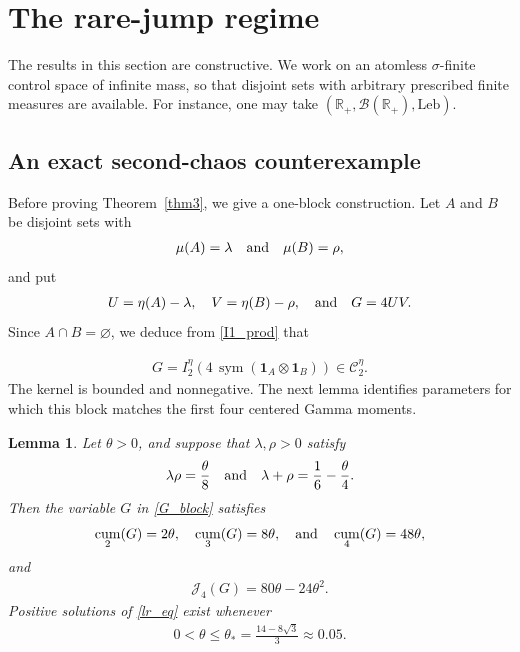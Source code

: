 \documentclass[letterpaper,11pt,reqno]{amsart}
\numberwithin{equation}{section}
\theoremstyle{plain}
\newtheorem{lemma}[theorem]{Lemma}
\theoremstyle{definition}
\theoremstyle{remark}
\newcommand{\R}{\mathbb{R}}
\newcommand{\ind}{\mathbf{1}}
\newcommand{\cC}{\mathcal{C}}
\DeclareMathOperator{\cum}{cum}
\DeclareMathOperator{\sym}{sym}
\newcommand{\noi}{\noindent}
\newcommand{\ot}{\otimes}
\newcommand{\Jfour}{\mathcal J_4}
\newcommand{\s}{\sigma}
\newcommand{\AND}{\quad{\rm and}\quad}
\begin{document}
\section{The rare-jump regime}
\label{SEC4}

 

The results in this section are constructive.  We work on an atomless
$\s$-finite control space of infinite mass, so that disjoint sets with
arbitrary prescribed finite measures are available.  For instance,
one may take $(\R_+,\mathcal B(\R_+),\mathrm{Leb})$.

 

\subsection{An exact second-chaos counterexample}
\label{SEC_34}

Before proving Theorem~\ref{thm3}, we give a one-block
construction.  Let $A$ and $B$ be disjoint
sets with
\noi
\begin{align*}
 \mu(A)=\lambda
 \AND
 \mu(B)=\rho,
\end{align*}
and put
\noi
\begin{align}
 U=\eta(A)-\lambda,
 \quad
 V=\eta(B)-\rho,
 \AND
 G=4UV.
 \label{G_block}
\end{align}
Since $A\cap B=\varnothing$, we deduce from \eqref{I1_prod} that

\noi
\begin{align}\label{block_G}
 G=I_2^\eta\left(
 4\,\sym(\ind_A\ot\ind_B)
 \right)\in\cC_2^\eta.
\end{align}
The kernel is bounded and nonnegative.  The next lemma identifies
parameters for which this block matches the first four centered Gamma
moments.

\begin{lemma}
\label{lem_block}
Let $\theta>0$, and suppose that $\lambda,\rho>0$ satisfy
\noi
\begin{align}
 \lambda\rho=\frac\theta8
 \AND
 \lambda+\rho=\frac16-\frac\theta4.
 \label{lr_eq}
\end{align}
Then the variable $G$ in \eqref{G_block} satisfies
\noi
\begin{align}
 \cum_2(G)=2\theta,
 \quad
 \cum_3(G)=8\theta,
 \AND
 \cum_4(G)=48\theta,
 \label{G_cum}
\end{align}
and
\noi
\begin{align}\label{J4G}
 \Jfour(G)=80\theta-24\theta^2.
\end{align}
Positive solutions of \eqref{lr_eq} exist whenever
\noi
\begin{align}
 0<\theta\leq
 \theta_\ast=\frac{14-8\sqrt3}{3} \approx 0.05.
 \label{theta_star}
\end{align}
\end{lemma}
\end{document}
